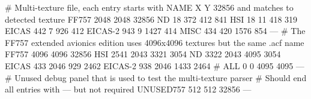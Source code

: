 # Multi-texture file, each entry starts with NAME X Y 32856 and matches to detected texture
FF757 2048 2048 32856
ND       18  372  412  841
HSI      18   11  418  319
EICAS   442    7  926  412
EICAS-2 943    9 1427  414
MISC    434  420 1576  854
---
# The FF757 extended avionics edition uses 4096x4096 textures but the same .acf name
FF757 4096 4096 32856
HSI    2541 2043 3321 3054
ND     3322 2043 4095 3054
EICAS   433 2046  929 2462
EICAS-2 938 2046 1433 2464
# ALL       0    0 4095 4095
---
# Unused debug panel that is used to test the multi-texture parser
# Should end all entries with --- but not required
UNUSED757 512 512 32856
---
